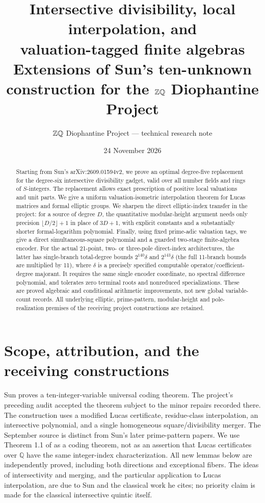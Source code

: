 \documentclass[11pt]{article}
\title{Intersective divisibility, local interpolation, and\protect\\valuation-tagged finite algebras\protect\\\large Extensions of Sun's ten-unknown construction for the $\Z\Q$ Diophantine Project}
\author{$\Z\Q$ Diophantine Project --- technical research note}
\date{24 November 2026}
\newcommand{\Q}{\mathbb Q}\newcommand{\Z}{\mathbb Z}\newcommand{\N}{\mathbb N}
\begin{document}
\maketitle
\begin{abstract}
Starting from Sun's arXiv:2609.01594v2, we prove an optimal degree-five
replacement for the degree-six intersective divisibility gadget, valid over
all number fields and rings of $S$-integers. The replacement allows exact
prescription of positive local valuations and unit parts. We give a uniform
valuation-isometric interpolation theorem for Lucas matrices and formal elliptic
groups. We sharpen the direct elliptic-index transfer in the project: for a
source of degree $D$, the quantitative modular-height argument needs only
precision $\lfloor D/2\rfloor+1$ in place of $3D+1$, with explicit constants
and a substantially shorter formal-logarithm polynomial. Finally, using
fixed prime-adic valuation tags, we give a direct simultaneous-square
polynomial and a guarded two-stage finite-algebra encoder. For the actual
21-point, two- or three-pole direct-index architectures, the latter has
single-branch total-degree bounds $2^{140}\delta$ and $2^{143}\delta$
(the full 11-branch bounds are multiplied by 11), where
$\delta$ is a precisely specified computable operator/coefficient-degree
majorant. It requires the same single encoder coordinate, no spectral
difference polynomial, and tolerates zero terminal roots and nonreduced
specializations. These are proved algebraic and conditional arithmetic
improvements, not new global variable-count records. All underlying elliptic, prime-pattern, modular-height and
pole-realization premises of the receiving project constructions are retained.
\end{abstract}

\tableofcontents

\section{Scope, attribution, and the receiving constructions}
Sun \cite{sun26} proves a ten-integer-variable universal coding theorem.
The project's preceding audit accepted the theorem subject to the minor
repairs recorded there. The construction uses a modified Lucas certificate,
residue-class interpolation, an intersective polynomial, and a single
homogeneous square/divisibility merger. The September source is distinct
from Sun's later prime-pattern papers. We use Theorem 1.1 of \cite{sun26}
as a coding theorem, not as an assertion that Lucas certificates over
$\Q$ have the same integer-index characterization. All new lemmas below
are independently proved, including both directions and exceptional fibers.
The ideas of intersectivity and merging, and the particular application to
Lucas interpolation, are due to Sun and the classical work he cites; no
priority claim is made for the classical intersective quintic itself.
\end{document}
